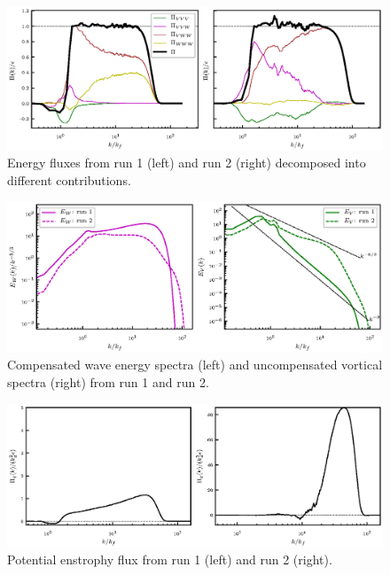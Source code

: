  \begin{figure}[h]
\centerline{\includegraphics[angle=0,width=17cm]{./fig5.eps}}
 \caption{Energy fluxes from run 1 (left) and run 2 (right) decomposed into different contributions. }
 \label{Flux2}
 \end{figure}
 
  \begin{figure}[h]
\centerline{\includegraphics[angle=0,width=17 cm]{./fig6.eps}}
 \caption{Compensated wave energy spectra (left) and uncompensated vortical spectra (right) from run 1 and run 2. }
 \label{C2}
 \end{figure}



\begin{figure}[h]
\centerline{\includegraphics[angle=0,width=17cm]{./fig7.eps}}
 \caption{Potential enstrophy flux from run 1 (left) and run 2 (right). }
 \label{EF1}
  \end{figure}
 

